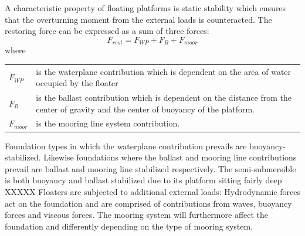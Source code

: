 A characteristic property of floating platforms is static stability which ensures that the overturning moment from the external loads is counteracted. The restoring force can be expressed as a sum of three forces:
\begin{equation} \label{eq:F_rest}
	F_{rest} = F_{WP} + F_B + F_{moor}
\end{equation}
where \smallskip 
\begin{center}
	\begin{tabular}{l p{12cm}}
		$ F_{WP} $ & is the waterplane contribution which is dependent on the area of water occupied by the floater \\
		$ F_{B} $ & is the ballast contribution which is dependent on the distance from the center of gravity and the center of buoyancy of the platform.\\
		$ F_{moor} $ & is the mooring line system contribution.
	\end{tabular}
\end{center} \smallskip
Foundation types in which the waterplane contribution prevails are buoyancy-stabilized. Likewise foundations where the ballast and mooring line contributions prevail are ballast and mooring line stabilized respectively. The semi-submersible is both buoyancy and ballast stabilized due to its platform sitting fairly deep XXXXX
Floaters are subjected to additional external loads: Hydrodynamic forces act on the foundation and are comprised of contributions from waves, buoyancy forces and viscous forces. The mooring system will furthermore affect the foundation and differently depending on the type of mooring system.\\

